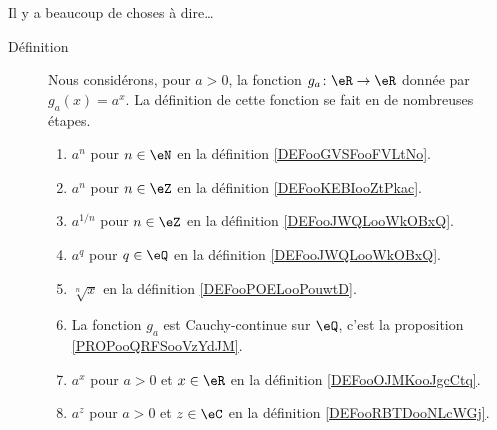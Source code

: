       \label{THEMEooBSBLooWcaQnR}

Il y a beaucoup de choses à dire\ldots

\begin{description}
	\item[Définition]
		Nous considérons, pour \( a>0\), la fonction \( g_a\colon \eR\to \eR\) donnée par \( g_a(x)=a^x\). La définition de cette fonction se fait en de nombreuses étapes.
		\begin{enumerate}
			\item
			      \( a^n\) pour \( n\in \eN\) en la définition \ref{DEFooGVSFooFVLtNo}.
			\item
			      \( a^n\) pour \( n\in \eZ\) en la définition \ref{DEFooKEBIooZtPkac}.
			\item
			      \( a^{1/n}\) pour \( n\in \eZ\) en la définition \ref{DEFooJWQLooWkOBxQ}.
			\item
			      \( a^q\) pour \( q\in \eQ\) en la définition \ref{DEFooJWQLooWkOBxQ}.
			\item
			      \( \sqrt[n]{ x }\) en la définition \ref{DEFooPOELooPouwtD}.
			\item
			      La fonction \( g_a\) est Cauchy-continue sur \( \eQ\), c'est la proposition \ref{PROPooQRFSooVzYdJM}.
			\item
			      \( a^x\) pour \( a>0\) et \( x\in \eR\) en la définition \ref{DEFooOJMKooJgcCtq}.
			\item
			      \( a^z\) pour \( a>0\) et \( z\in \eC\) en la définition \ref{DEFooRBTDooNLcWGj}.
		\end{enumerate}


\end{description}
